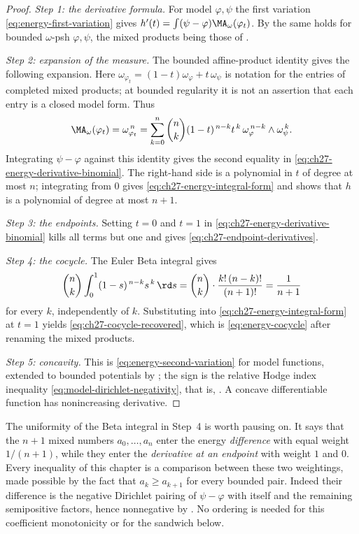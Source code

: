 \begin{proof}
\emph{Step 1: the derivative formula.}
For model $\varphi,\psi$ the first variation
\eqref{eq:energy-first-variation} gives
$h'(t)=\int(\psi-\varphi)\MA_\omega(\varphi_t)$.  By
 the same holds for bounded
$\omega$-psh $\varphi,\psi$, the mixed products being those of
.

\emph{Step 2: expansion of the measure.}
The bounded affine-product identity
 gives the following expansion.
Here $\omega_{\varphi_t}=(1-t)\omega_\varphi+t\,\omega_\psi$ is notation
for the entries of completed mixed products; at bounded regularity it is
not an assertion that each entry is a closed model form.  Thus
\[
 \MA_\omega(\varphi_t)=\omega_{\varphi_t}^{\,n}
 =\sum_{k=0}^n\binom nk(1-t)^{\,n-k}t^{\,k}\,
   \omega_\varphi^{\,n-k}\wedge\omega_\psi^{\,k}.
\]
Integrating $\psi-\varphi$ against this identity gives the second equality
in \eqref{eq:ch27-energy-derivative-binomial}.  The right-hand side is a
polynomial in $t$ of degree at most $n$; integrating from $0$ gives
\eqref{eq:ch27-energy-integral-form} and shows that $h$ is a polynomial of
degree at most $n+1$.

\emph{Step 3: the endpoints.}
Setting $t=0$ and $t=1$ in
\eqref{eq:ch27-energy-derivative-binomial} kills all terms but one and gives
\eqref{eq:ch27-endpoint-derivatives}.

\emph{Step 4: the cocycle.}
The Euler Beta integral gives
\[
 \binom nk\int_0^1(1-s)^{\,n-k}s^{\,k}\,\rd s
 =\binom nk\cdot\frac{k!\,(n-k)!}{(n+1)!}
 =\frac1{n+1}
\]
for every $k$, independently of $k$.  Substituting into
\eqref{eq:ch27-energy-integral-form} at $t=1$ yields
\eqref{eq:ch27-cocycle-recovered}, which is
\eqref{eq:energy-cocycle} after renaming the mixed products.

\emph{Step 5: concavity.}
This is \eqref{eq:energy-second-variation} for model functions, extended to
bounded potentials by ; the sign is the
relative Hodge index inequality \eqref{eq:model-dirichlet-negativity}, that
is, .  A concave differentiable function has
nonincreasing derivative.
\end{proof}

\begin{remark}
\label{rem:ch27-beta-identity}
The uniformity of the Beta integral in Step~4 is worth pausing on.  It says
that the $n+1$ mixed numbers $a_0,\dots,a_n$ enter the energy
\emph{difference} with equal weight $1/(n+1)$, while they enter the
\emph{derivative at an endpoint} with weight $1$ and $0$.  Every
inequality of this chapter is a comparison between these two weightings,
made possible by the fact that $a_k\geq a_{k+1}$ for every bounded pair.
Indeed their difference is the negative Dirichlet pairing of
$\psi-\varphi$ with itself and the remaining semipositive factors, hence
nonnegative by .  No ordering is needed for this
coefficient monotonicity or for the sandwich below.
\end{remark}

